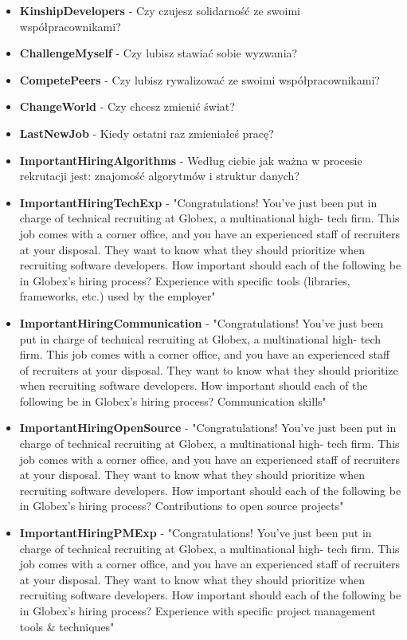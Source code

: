 \begin{appendices}
\begin{itemize}
        \item \textbf{KinshipDevelopers} - Czy czujesz solidarność ze swoimi współpracownikami?
        \item \textbf{ChallengeMyself} - Czy lubisz stawiać sobie wyzwania?
        \item \textbf{CompetePeers} - Czy lubisz rywalizować ze swoimi współpracownikami?
        \item \textbf{ChangeWorld} - Czy chcesz zmienić świat?
        \item \textbf{LastNewJob} - Kiedy ostatni raz zmieniałeś pracę?
        \item \textbf{ImportantHiringAlgorithms} - Według ciebie jak ważna w procesie rekrutacji jest: znajomość algorytmów i struktur danych?
        \item \textbf{ImportantHiringTechExp} - "Congratulations! You've just been put in charge of technical recruiting at Globex, a multinational high- tech firm. This job comes with a corner office, and you have an experienced staff of recruiters at your disposal. They want to know what they should prioritize when recruiting software developers. How important should each of the following be in Globex's hiring process? Experience with specific tools (libraries, frameworks, etc.) used by the employer"
        \item \textbf{ImportantHiringCommunication} - "Congratulations! You've just been put in charge of technical recruiting at Globex, a multinational high- tech firm. This job comes with a corner office, and you have an experienced staff of recruiters at your disposal. They want to know what they should prioritize when recruiting software developers. How important should each of the following be in Globex's hiring process? Communication skills"
        \item \textbf{ImportantHiringOpenSource} - "Congratulations! You've just been put in charge of technical recruiting at Globex, a multinational high- tech firm. This job comes with a corner office, and you have an experienced staff of recruiters at your disposal. They want to know what they should prioritize when recruiting software developers. How important should each of the following be in Globex's hiring process? Contributions to open source projects"
        \item \textbf{ImportantHiringPMExp} - "Congratulations! You've just been put in charge of technical recruiting at Globex, a multinational high- tech firm. This job comes with a corner office, and you have an experienced staff of recruiters at your disposal. They want to know what they should prioritize when recruiting software developers. How important should each of the following be in Globex's hiring process? Experience with specific project management tools & techniques"

\end{itemize}
\end{appendices}
